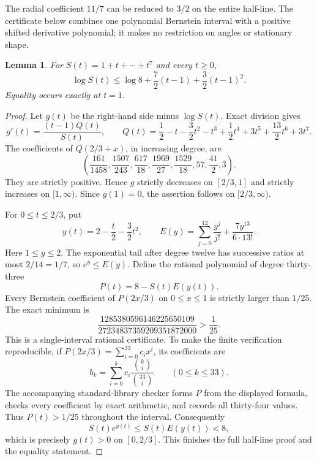 \documentclass[11pt]{article}
\newtheorem{lemma}[theorem]{Lemma}
\theoremstyle{remark}
\numberwithin{equation}{section}
\begin{document}
The radial coefficient $11/7$ can be reduced to $3/2$ on the
entire half-line. The certificate below combines one polynomial
Bernstein interval with a positive shifted derivative polynomial;
it makes no restriction on angles or stationary shape.

\begin{lemma}\label{lem:noorigin-oct8-eight-radial}
For $S(t)=1+t+\cdots+t^7$ and every $t\ge0$,
\[
 \log S(t)\le\log8+\frac72(t-1)+\frac32(t-1)^2.
\]
Equality occurs exactly at $t=1$.
\end{lemma}
\begin{proof}
Let $g(t)$ be the right-hand side minus $\log S(t)$.
Exact division gives
\[
 g'(t)=\frac{(t-1)Q(t)}{S(t)},\qquad
 Q(t)=\frac12-t-\frac32t^2-t^3+\frac12t^4+3t^5
                               +\frac{13}{2}t^6+3t^7.
\]
The coefficients of $Q(2/3+x)$, in increasing degree, are
\[
 \left(\frac{161}{1458},\frac{1507}{243},\frac{617}{18},
       \frac{1969}{27},\frac{1529}{18},57,\frac{41}{2},3\right).
\]
They are strictly positive. Hence $g$ strictly decreases on
$[2/3,1]$ and strictly increases on $[1,\infty)$.
Since $g(1)=0$, the assertion follows on $[2/3,\infty)$.

For $0\le t\le2/3$, put
\[
 y(t)=2-\frac t2-\frac32t^2,\qquad
 E(y)=\sum_{j=0}^{12}\frac{y^j}{j!}
                             +\frac{7y^{13}}{6\cdot13!}.
\]
Here $1\le y\le2$. The exponential tail after degree twelve
has successive ratios at most $2/14=1/7$, so $e^y\le E(y)$.
Define the rational polynomial of degree thirty-three
\[
                         P(t)=8-S(t)E(y(t)).
\]
Every Bernstein coefficient of $P(2x/3)$ on $0\le x\le1$
is strictly larger than $1/25$. The exact minimum is
\[
        \frac{1285380596146225650109}{27234837359209351872000}
                                    >\frac1{25}.
\]
This is a single-interval rational certificate. To make the
finite verification reproducible, if
$P(2x/3)=\sum_{i=0}^{33}c_i x^i$, its coefficients are
\[
       b_k=\sum_{i=0}^k c_i\frac{\binom{k}{i}}{\binom{33}{i}}
                         \qquad(0\le k\le33).
\]
The accompanying standard-library checker forms $P$ from the
displayed formula, checks every coefficient by exact arithmetic,
and records all thirty-four values. Thus $P(t)>1/25$ throughout
the interval. Consequently
\[
                S(t)e^{y(t)}\le S(t)E(y(t))<8,
\]
which is precisely $g(t)>0$ on $[0,2/3]$.
This finishes the full half-line proof and the equality statement.
\end{proof}
\end{document}
